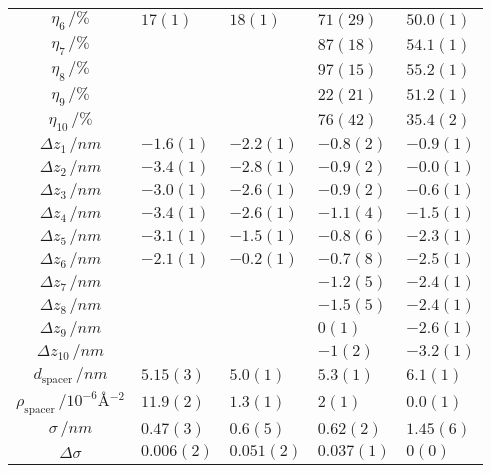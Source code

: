 \documentclass[\main/dresen_thesis.tex]{subfiles}
\begin{document}
\begin{table}[!htbp]
\begin{tabular}{ c | l | l | l | l}
       $\eta_6     \, / \unit{\%}$      & $17(1)$   & $18(1)$   & $71(29)$  & $50.0(1)$\\
       $\eta_7     \, / \unit{\%}$      &           &           & $87(18)$  & $54.1(1)$\\
       $\eta_8     \, / \unit{\%}$      &           &           & $97(15)$  & $55.2(1)$\\
       $\eta_9     \, / \unit{\%}$      &           &           & $22(21)$  & $51.2(1)$\\
       $\eta_{10}     \, / \unit{\%}$   &           &           & $76(42)$  & $35.4(2)$\\
       \hline
       $\Delta z_1 \, / \unit{nm} $     & $-1.6(1)$ & $-2.2(1)$ & $-0.8(2)$ & $-0.9(1)$\\
       $\Delta z_2 \, / \unit{nm} $     & $-3.4(1)$ & $-2.8(1)$ & $-0.9(2)$ & $-0.0(1)$\\
       $\Delta z_3 \, / \unit{nm} $     & $-3.0(1)$ & $-2.6(1)$ & $-0.9(2)$ & $-0.6(1)$\\
       $\Delta z_4 \, / \unit{nm} $     & $-3.4(1)$ & $-2.6(1)$ & $-1.1(4)$ & $-1.5(1)$\\
       $\Delta z_5 \, / \unit{nm} $     & $-3.1(1)$ & $-1.5(1)$ & $-0.8(6)$ & $-2.3(1)$\\
       $\Delta z_6 \, / \unit{nm} $     & $-2.1(1)$ & $-0.2(1)$ & $-0.7(8)$ & $-2.5(1)$\\
       $\Delta z_7 \, / \unit{nm} $     &           &           & $-1.2(5)$ & $-2.4(1)$\\
       $\Delta z_8 \, / \unit{nm} $     &           &           & $-1.5(5)$ & $-2.4(1)$\\
       $\Delta z_9 \, / \unit{nm} $     &           &           & $ 0(1)$   & $-2.6(1)$\\
       $\Delta z_{10} \, / \unit{nm} $  &           &           & $-1(2)$   & $-3.2(1)$\\
       \hline
       $d_\mathrm{spacer}   \, / \unit{nm} $                        & $5.15(3)$ & $5.0(1)$  & $5.3(1)$ & $6.1(1)$\\
       $\rho_\mathrm{spacer}\, / \unit{10^{-6} \angstrom^{-2}} $    & $11.9(2)$ & $1.3(1)$  & $2(1)$   & $0.0(1)$\\
       $\sigma     \, / \unit{nm} $                                 & $0.47(3)$ & $0.6(5)$  & $0.62(2)$& $1.45(6)$\\
       $\Delta \sigma$                                              & $0.006(2)$& $0.051(2)$& $0.037(1)$ & $0(0)$\\

\end{tabular}
\end{table}
\end{document}
